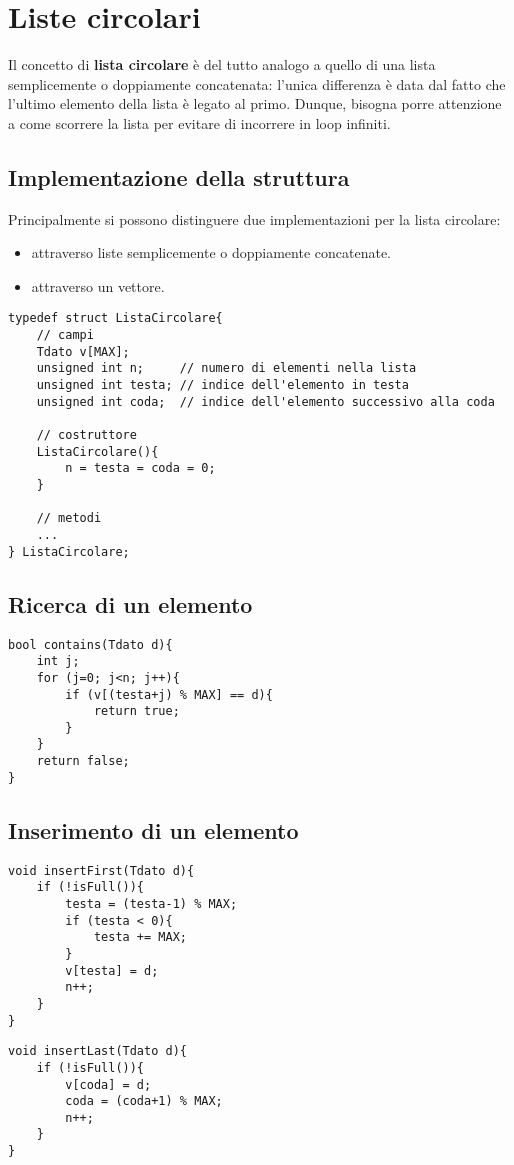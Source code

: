 \chapter{Liste circolari}
Il concetto di \textbf{lista circolare} è del tutto analogo a quello di una lista semplicemente o doppiamente concatenata: l'unica differenza è data dal fatto che l'ultimo elemento della lista è legato al primo. Dunque, bisogna porre attenzione a come scorrere la lista per evitare di incorrere in loop infiniti.

\section{Implementazione della struttura}
Principalmente si possono distinguere due implementazioni per la lista circolare:
\begin{itemize}[noitemsep, nolistsep]
	\item attraverso liste semplicemente o doppiamente concatenate.
	\item attraverso un vettore.
\end{itemize}
\begin{lstlisting}[title={Implementazione di una lista circolare in C++}]
typedef struct ListaCircolare{
    // campi
    Tdato v[MAX];
    unsigned int n;     // numero di elementi nella lista
    unsigned int testa; // indice dell'elemento in testa
    unsigned int coda;  // indice dell'elemento successivo alla coda

    // costruttore
    ListaCircolare(){
        n = testa = coda = 0;
    }
    
    // metodi
    ...
} ListaCircolare;
\end{lstlisting}

\section{Ricerca di un elemento}
\begin{lstlisting}[title={Metodo per la ricerca di un elemento in una lista circolare}]
bool contains(Tdato d){
    int j;
    for (j=0; j<n; j++){
        if (v[(testa+j) % MAX] == d){
            return true;
        }
    }
    return false;
}
\end{lstlisting}

\section{Inserimento di un elemento}
\begin{lstlisting}[title={Metodo per l'inserimento in testa in una lista circolare}]
void insertFirst(Tdato d){
    if (!isFull()){
        testa = (testa-1) % MAX;
        if (testa < 0){
            testa += MAX;
        }
        v[testa] = d;
        n++;
    }
}
\end{lstlisting}
\begin{lstlisting}[title={Metodo per l'inserimento in coda in una lista circolare}]
void insertLast(Tdato d){
    if (!isFull()){
        v[coda] = d;
        coda = (coda+1) % MAX;
        n++;
    }
}
\end{lstlisting}

